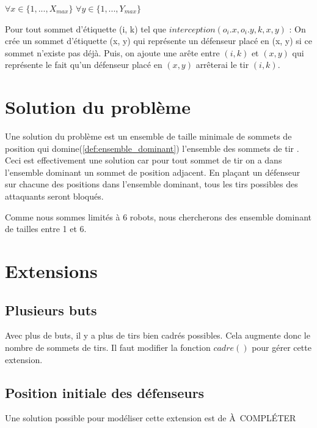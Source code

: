 $\forall x \in \{1, ..., X_{max}\}$ $\forall y \in \{1, ..., Y_{max}\}$ 

Pour tout sommet d'étiquette (i, k) tel que $interception(o_i.x, o_i.y, k, x, y)$ : On crée un sommet d'étiquette (x, y) qui représente un défenseur placé en (x, y) si ce sommet n'existe pas déjà. Puis, on ajoute une arête entre $(i, k)$ et $(x, y)$ qui représente le fait qu'un défenseur placé en $(x, y)$ arrêterai le tir $(i, k)$.

\section{Solution du problème}
Une solution du problème est un ensemble de taille minimale de sommets de position qui domine(\ref{def:ensemble_dominant}) l'ensemble des sommets de tir . Ceci est effectivement une solution car pour tout sommet de tir on a dans l'ensemble dominant un sommet de position adjacent. En plaçant un défenseur sur chacune des positions dans l'ensemble dominant, tous les tirs possibles des attaquants seront bloqués.

Comme nous sommes limités à 6 robots, nous chercherons des ensemble dominant de tailles entre 1 et 6.

\section{Extensions}
\subsection{Plusieurs buts}
Avec plus de buts, il y a plus de tirs bien cadrés possibles. Cela augmente donc le nombre de sommets de tirs. Il faut modifier la fonction $cadre()$ pour gérer cette extension.

\subsection{Position initiale des défenseurs}
Une solution possible pour modéliser cette extension est de À COMPLÉTER

